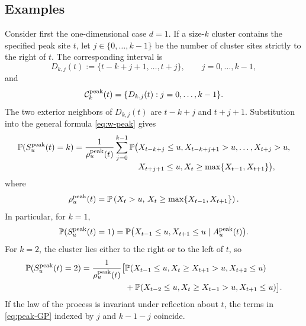 \documentclass[aap,preprint]{imsart}
\theoremstyle{plain}
\theoremstyle{definition}
\def\P{{\mathbb P}}
\begin{document}
	\subsection{Examples}
	
	Consider first the one-dimensional case $d=1$.  If a size-$k$ cluster
	contains the specified peak site $t$, let $j\in\{0,\ldots,k-1\}$ be the
	number of cluster sites strictly to the right of $t$.  The corresponding
	interval is
	\begin{equation*}
		D_{k,j}(t)
		:=\{t-k+j+1,\ldots,t+j\},
		\qquad j=0,\ldots,k-1,
	\end{equation*}
	and
	\[
	\mathcal C_k^{\rm peak}(t)
	=\{D_{k,j}(t):j=0,\ldots,k-1\}.
	\]
	The two exterior neighbors of $D_{k,j}(t)$ are $t-k+j$ and $t+j+1$.
	Substitution into the general formula \eqref{eq:w-peak} gives
	\begin{equation}\label{eq:peak-GP}
		\begin{split}
			\P(S_u^{\rm peak}(t)=k)
			={1\over\rho_u^{\rm peak}(t)}
			\sum_{j=0}^{k-1}\P\bigl(&X_{t-k+j}\leq u,
			X_{t-k+j+1}>u,\ldots,X_{t+j}>u,\\[-1mm]
			&X_{t+j+1}\leq u,
			X_t\ge \max\{X_{t-1},X_{t+1}\}\bigr),
		\end{split}
	\end{equation}
	where
	\[
	\rho_u^{\rm peak}(t) = \P\left(X_t>u, \, X_t\ge \max\{X_{t-1},X_{t+1}\}\right).
	\]
	In particular, for $k=1$,
	\begin{equation}\label{eq:peak1}
		\P(S_u^{\rm peak}(t)=1)
		=
		\P\bigl(X_{t-1}\leq u,X_{t+1}\leq u
		\mid A_u^{\rm peak}(t)\bigr).
	\end{equation}
	For $k=2$, the cluster lies either to the right or to the left of $t$, so
	\begin{equation}\label{eq:peak2}
		\begin{split}
			\P(S_u^{\rm peak}(t)=2)
			={1\over\rho_u^{\rm peak}(t)}\bigl[&
			\P(X_{t-1}\leq u,X_t\ge X_{t+1}>u,X_{t+2}\leq u)\\
			&+\P(X_{t-2}\leq u,X_t\ge X_{t-1}>u,X_{t+1}\leq u)
			\bigr].
		\end{split}
	\end{equation}
	If the law of the process is invariant under reflection about $t$, the terms
	in \eqref{eq:peak-GP} indexed by $j$ and $k-1-j$ coincide.  
	
\end{document}
